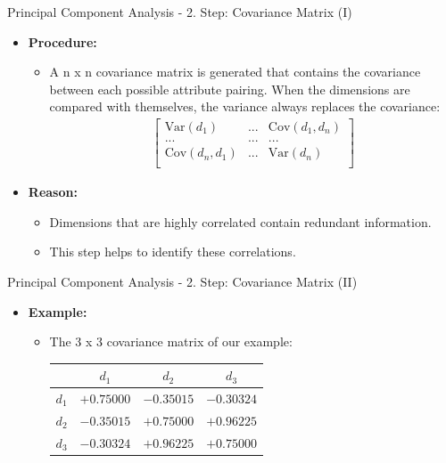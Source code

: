 \begin{frame}{Principal Component Analysis - 2. Step: Covariance Matrix (I)}
	\begin{itemize}
		\item \textbf{Procedure:}
		\begin{itemize}
			\item A n x n covariance matrix is generated that contains the 
			covariance between each possible attribute pairing. When the 
			dimensions are compared with themselves, the variance always 
			replaces the covariance:
			\begin{align}
				\begin{bmatrix}
					\text{Var}(d_1) & ... & \text{Cov}(d_1, d_n) \\
					... & ... & ... \\
					\text{Cov}(d_n, d_1) & ... & \text{Var}(d_n) \\
				\end{bmatrix}
			\end{align}
		\end{itemize}
		\item \textbf{Reason:}
		\begin{itemize}
			\item Dimensions that are highly correlated contain redundant 
			information.
			\item This step helps to identify these correlations.
		\end{itemize}
	\end{itemize}
\end{frame}

\begin{frame}{Principal Component Analysis - 2. Step: Covariance Matrix (II)}
	\begin{itemize}
		\item \textbf{Example:}
		\begin{itemize}
			\item The 3 x 3 covariance matrix of our example: \\
			\vspace{3mm}
			\begin{center}
				\centering
				\begin{tabular}{|l|c|c|c|}
					\hline
								& $d_1$ 	& $d_2$ 	& $d_3$
					\\\hline
					$d_1$		& $+0.75000$		& $-0.35015$ 	& 
					$-0.30324$                   
					\\\hline
					$d_2$		& $-0.35015$		& $+0.75000$ 	& 
					$+0.96225$                   
					\\\hline
					$d_3$		& $-0.30324$		& $+0.96225$ 	& 
					$+0.75000$                   
					\\\hline
				\end{tabular}
			\end{center}
		\end{itemize}
	\end{itemize}
\end{frame}

